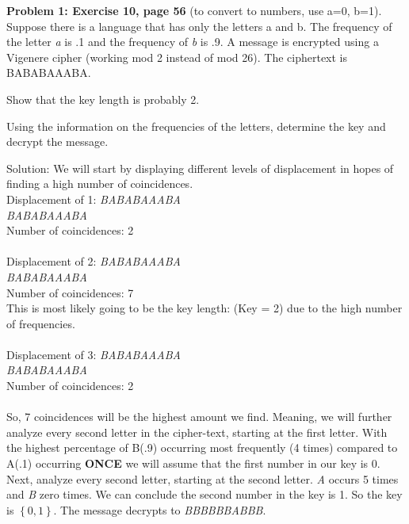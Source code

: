 \documentclass[12pt,letterpaper,final]{report}
\begin{document}

\vline


\noindent\textbf{Problem 1: Exercise 10, page 56}
 (to convert to numbers, use a=0, b=1). Suppose there is a language that has only the letters a and b. The frequency of the letter \textit a is .1 and the frequency of \textit b is .9. A message
is encrypted using a Vigenere cipher (working mod 2 instead of mod
26). The ciphertext is BABABAAABA. 

\bigskip
{}
\begin{alphalist}
	\item Show that the key length is probably 2.
	\item Using the information on the frequencies of the letters, determine the key and decrypt the message.
\end{alphalist}
\bigskip  Solution: We will start by displaying different levels of displacement in hopes of finding a high number of coincidences. \\
Displacement of 1:  \indent\indent \textit{BABABAAABA} \\
\phantom{BBBBBBBBBB}  \indent\indent \textit{BABABAAABA} \\
Number of coincidences: 2 \\\\
Displacement of 2:  \indent\indent \textit{BABABAAABA} \\
\phantom{BBBBBBBBB}  \indent\indent \textit{BABABAAABA} \\
Number of coincidences: 7 \\ This is most likely going to be the key length: (Key = 2) due to the high number of frequencies.\\\\
Displacement of 3: \indent\indent \textit{BABABAAABA} \\
\phantom{BBBBBBBB} \indent\indent \textit{BABABAAABA} \\
Number of coincidences: 2 \\\\
So, 7 coincidences will be the highest amount we find. Meaning, we will further analyze every second letter in the cipher-text, starting at the first letter. With the highest percentage of B(.9) occurring most frequently (4 times) compared to A(.1) occurring \textbf{ONCE} we will assume that the first number in our key is 0. Next, analyze every second letter, starting at the second letter. \textit A occurs 5 times and \textit B zero times. We can conclude the second number in the key is 1. So the key is $\left\{0,1 \right\}$. The message decrypts to \textit{BBBBBBABBB}.
\end{document}
